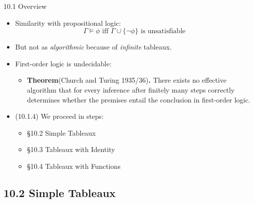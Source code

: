 \begin{frame}{10.1 Overview}

	\begin{itemize}
	\itemsep=10pt
		
		\item Similarity with propositional logic:
		\[\Gamma\vDash\phi\text{ iff }\Gamma\cup\{\neg\phi\}\text{ is unsatisfiable}\]

		\item But not as \emph{algorithmic} because of \emph{infinite} tableaux.
		
		\item First-order logic is undecidable: 
				
		\begin{itemize}
		
			\item \textbf{Theorem}(Church and Turing 1935/36)\textbf{.} There exists no effective algorithm that for every inference after finitely many steps correctly determines whether the premises entail the conclusion in first-order logic.
			
		\end{itemize}
		
		\item (10.1.4) We proceed in steps:
		
			\begin{itemize}
			
				\item \S10.2 Simple Tableaux
				
				\item \S10.3 Tableaux with Identity
				
				\item \S10.4 Tableaux with Functions
			
			\end{itemize}

	\end{itemize}

\end{frame}

\subsection{10.2 Simple Tableaux}

